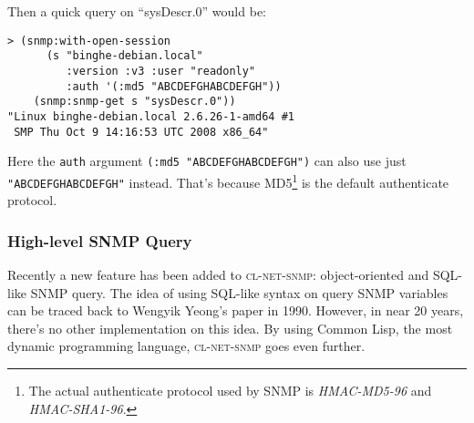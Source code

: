 \documentclass[reprint,9pt]{sigplanconf}
\begin{document}
Then a quick query on ``sysDescr.0'' would be:
\begin{verbatim}
> (snmp:with-open-session
      (s "binghe-debian.local"
         :version :v3 :user "readonly"
         :auth '(:md5 "ABCDEFGHABCDEFGH"))
    (snmp:snmp-get s "sysDescr.0"))
"Linux binghe-debian.local 2.6.26-1-amd64 #1
 SMP Thu Oct 9 14:16:53 UTC 2008 x86_64"
\end{verbatim}

Here the \texttt{auth} argument \texttt{(:md5 "ABCDEFGHABCDEFGH")} can
also use just \texttt{"ABCDEFGHABCDEFGH"} instead. That's because
MD5\footnote{The actual authenticate protocol used by SNMP is
  \textsl{HMAC-MD5-96} and \textsl{HMAC-SHA1-96}.} is the default
authenticate protocol.

\subsubsection{High-level SNMP Query}

Recently a new feature has been added to \textsc{cl-net-snmp}: object-oriented
and SQL-like SNMP query. The idea of using SQL-like syntax on query SNMP
variables can be traced back to Wengyik Yeong's paper \cite{SNMPql} in 1990.
However, in near 20 years, there's no other implementation on this idea.
By using Common Lisp, the most dynamic programming language, \textsc{cl-net-snmp}
goes even further.
\end{document}
